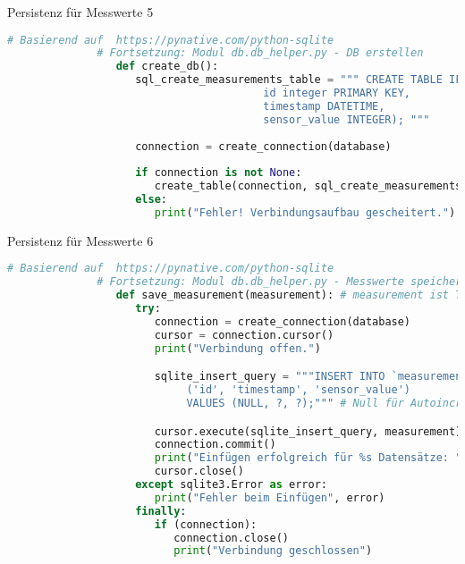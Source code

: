 \begin{frame}[fragile]{Persistenz für Messwerte 5}
       \begin{lstlisting}[language=Python, gobble=8]
              # Basierend auf  https://pynative.com/python-sqlite
              # Fortsetzung: Modul db.db_helper.py - DB erstellen
                 def create_db():
                    sql_create_measurements_table = """ CREATE TABLE IF NOT EXISTS measurements (
                                        id integer PRIMARY KEY,
                                        timestamp DATETIME,
                                        sensor_value INTEGER); """
 
                    connection = create_connection(database)
 
                    if connection is not None:
                       create_table(connection, sql_create_measurements_table)
                    else:
                       print("Fehler! Verbindungsaufbau gescheitert.")

        \end{lstlisting}

\end{frame}


\begin{frame}[fragile]{Persistenz für Messwerte 6}
       \begin{lstlisting}[language=Python, gobble=8]
              # Basierend auf  https://pynative.com/python-sqlite
              # Fortsetzung: Modul db.db_helper.py - Messwerte speichern
                 def save_measurement(measurement): # measurement ist Tupel (Zeitstempel, Messwert)
                    try:
                       connection = create_connection(database)
                       cursor = connection.cursor()
                       print("Verbindung offen.")

                       sqlite_insert_query = """INSERT INTO `measurements`
                            ('id', 'timestamp', 'sensor_value') 
                            VALUES (NULL, ?, ?);""" # Null für Autoincrement

                       cursor.execute(sqlite_insert_query, measurement)
                       connection.commit()
                       print("Einfügen erfolgreich für %s Datensätze: ", cursor.rowcount)
                       cursor.close()
                    except sqlite3.Error as error:
                       print("Fehler beim Einfügen", error)
                    finally:
                       if (connection):
                          connection.close()
                          print("Verbindung geschlossen")
       \end{lstlisting}

\end{frame}

